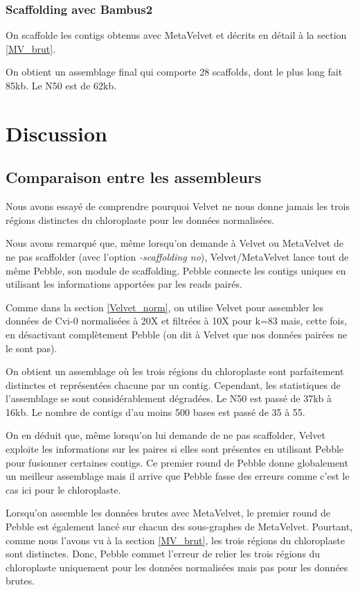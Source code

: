 \documentclass[a4paper]{article}
\begin{document}
\subsubsection{Scaffolding avec Bambus2}

On scaffolde les contigs obtenus avec MetaVelvet et décrits en détail à la section \ref{MV_brut}.

On obtient un assemblage final qui comporte 28 scaffolds, dont le plus long fait 85kb. Le N50 est de 62kb. 

 
\section{Discussion}

\subsection{Comparaison entre les assembleurs}

Nous avons essayé de comprendre pourquoi Velvet ne nous donne jamais les trois régions distinctes du chloroplaste pour les données normalisées. 

Nous avons remarqué que, même lorsqu'on demande à Velvet ou MetaVelvet de ne pas scaffolder (avec l'option \textit{-scaffolding no}), Velvet/MetaVelvet lance tout de même Pebble, son module de scaffolding. Pebble connecte les contigs uniques en utilisant les informations apportées par les reads pairés. 

Comme dans la section \ref{Velvet_norm}, on utilise Velvet pour assembler les données de Cvi-0 normalisées à 20X et filtrées à 10X pour k=83 mais, cette fois,  en désactivant complètement Pebble (on dit à Velvet que nos données pairées ne le sont pas). 

On obtient un assemblage où les trois régions du chloroplaste sont parfaitement distinctes et représentées chacune par un contig. Cependant, les statistiques de l'assemblage se sont considérablement dégradées. Le N50 est passé de 37kb à 16kb. Le nombre de contigs d'au moins 500 bases est passé de 35 à 55. 

On en déduit que, même lorsqu'on lui demande de ne pas scaffolder, Velvet exploite les informations sur les paires si elles sont présentes en utilisant Pebble pour fusionner certaines contigs. Ce premier round de Pebble donne globalement un meilleur assemblage mais il arrive que Pebble fasse des erreurs comme c'est le cas ici pour le chloroplaste. 

Lorsqu'on assemble les données brutes avec MetaVelvet, le premier round de Pebble est également lancé sur chacun des sous-graphes de MetaVelvet. Pourtant, comme nous l'avons vu à la section \ref{MV_brut}, les trois régions du chloroplaste sont distinctes. Donc, Pebble commet l'erreur de relier les trois régions du chloroplaste uniquement pour les données normalisées mais pas pour les données brutes. 
\end{document}
